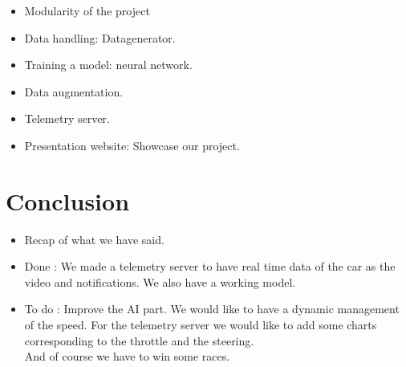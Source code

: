 \documentclass[11pt]{article}
\begin{document}
\begin{itemize}

\item Modularity of the project %
\item Data handling: Datagenerator. %
\item Training a model: neural network. %
\item Data augmentation. %
\item Telemetry server. %
\item Presentation website: Showcase our project. %

\end{itemize}

\section {Conclusion}

\begin{itemize}
\item Recap of what we have said.
\item Done : We made a telemetry server to have real time data of the car as the video and notifications. We also have a working model.

\item To do : Improve the AI part. We would like to have a dynamic management of the speed. For the telemetry server we would like to add some charts corresponding to the throttle and the steering. \\
And of course we have to win some races.

\end{itemize}
\end{document}

